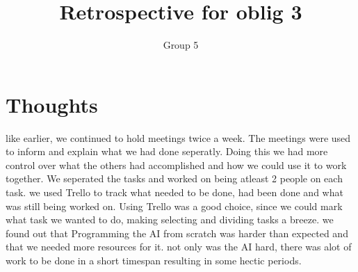 \documentclass{article}
\title{Retrospective for oblig 3}
\author{Group 5}
\date{}
\begin{document}
    \maketitle
    
    \section{Thoughts}
    \noindent
     like earlier, we continued to hold meetings twice a week. The meetings were used to inform and explain what we had
     done seperatly. Doing this we had more control over what the others had accomplished and how we could use it to work together.
     We seperated the tasks and worked on being atleast 2 people on each task. we used Trello to track what needed to be done,
     had been done and what was still being worked on. Using Trello was a good choice, since we could mark what task we
     wanted to do, making selecting and dividing tasks a breeze. we found out that Programming the AI from scratch was harder than expected
     and that we needed more resources for it. not only was the AI hard, there was alot of work to be done in a short timespan
     resulting in some hectic periods.
\end{document}
